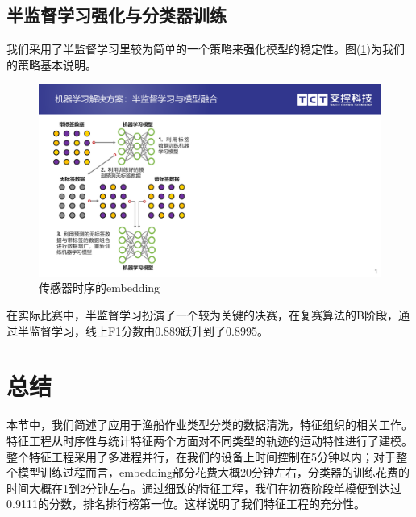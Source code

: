 \documentclass[UTF8, 12pt]{ctexart}
\begin{document}
		\subsection{半监督学习强化与分类器训练}
		我们采用了半监督学习里较为简单的一个策略来强化模型的稳定性。图(\ref{sec_2_fake_labels})为我们的策略基本说明。
		\begin{figure}[H]
			\centering
			\includegraphics[width=0.55\linewidth]{..//plots//fake_labels.pdf}
			\caption{传感器时序的embedding}
			\label{sec_2_fake_labels}
			\vspace{-0.2cm}
		\end{figure}
		在实际比赛中，半监督学习扮演了一个较为关键的决赛，在复赛算法的B阶段，通过半监督学习，线上F1分数由0.889跃升到了0.8995。


		\section{总结}\label{sec_3}
		本节中，我们简述了应用于渔船作业类型分类的数据清洗，特征组织的相关工作。特征工程从时序性与统计特征两个方面对不同类型的轨迹的运动特性进行了建模。整个特征工程采用了多进程并行，在我们的设备上时间控制在5分钟以内；对于整个模型训练过程而言，embedding部分花费大概20分钟左右，分类器的训练花费的时间大概在1到2分钟左右。通过细致的特征工程，我们在初赛阶段单模便到达过0.9111的分数，排名排行榜第一位。这样说明了我们特征工程的充分性。

	
	
\end{document}

